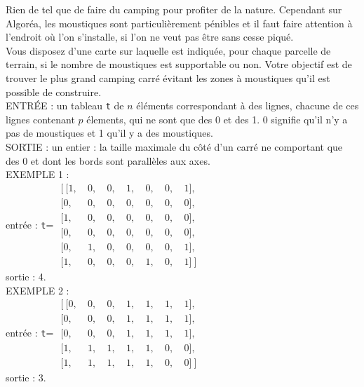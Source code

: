 \exer{}
\setcounter{numques}{0}

Rien de tel que de faire du camping pour profiter de la nature. Cependant sur Algoréa, les 
moustiques sont particulièrement pénibles et il faut faire attention à l'endroit où l'on s'installe, 
si l'on ne veut pas être sans cesse piqué.\\

Vous disposez d'une carte sur laquelle est indiquée, pour chaque parcelle de terrain, si le nombre 
de moustiques est supportable ou non. Votre objectif est de trouver le plus grand camping carré 
évitant les zones à moustiques qu'il est possible de construire.\\

\noindent ENTRÉE :  un tableau \texttt{t} de $n$ éléments correspondant à des lignes, chacune de 
ces lignes contenant $p$ élements, qui ne sont que des 0 et des 1. 0 signifie qu'il n'y a pas de 
moustiques et 1 qu'il y a des moustiques.\\
SORTIE : un entier : la taille maximale du côté d'un carré ne comportant que des 0 et dont les 
bords sont parallèles aux axes.\\

\noindent EXEMPLE 1 :\\
entrée : \texttt{t}= $\begin{matrix}[\  [1,\ &0,\ &0,\ &1,\ &0,\ &0,\ &1],\\
                          [0,\ &0,\ &0,\ &0,\ &0,\ &0,\ &0],\\
                          [1,\ &0,\ &0,\ &0,\ &0,\ &0,\ &0],\\
                          [0,\ &0,\ &0,\ &0,\ &0,\ &0,\ &0],\\
                          [0,\ &1,\ &0,\ &0,\ &0,\ &0,\ &1],\\
                          [1,\ &0,\ &0,\ &0,\ &1,\ &0,\ &1]\ ]
                         \end{matrix}$\\
sortie : 4.\\

\noindent EXEMPLE 2 :\\
entrée : \texttt{t}= $\begin{matrix}[\  [0,\ &0,\ &0,\ &1,\ &1,\ &1,\ &1],\\
                          [0,\ &0,\ &0,\ &1,\ &1,\ &1,\ &1],\\
                          [0,\ &0,\ &0,\ &1,\ &1,\ &1,\ &1],\\
                          [1,\ &1,\ &1,\ &1,\ &1,\ &0,\ &0],\\
                          [1,\ &1,\ &1,\ &1,\ &1,\ &0,\ &0]\ ]
                         \end{matrix}$\\
sortie : 3.